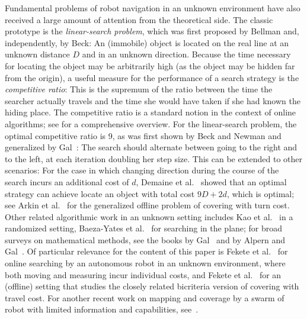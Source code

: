 Fundamental problems of robot navigation in an unknown environment have also received a large amount of attention from the theoretical side.
The classic prototype is the {\em linear-search problem}, which was first proposed by Bellman \cite{B63} and, independently,
by Beck\cite{B64}: An (immobile) object is located on the real line at an unknown distance $D$ and in an unknown direction.
Because the time necessary for locating the object may be arbitrarily high (as the object may be hidden far
from the origin), a useful measure for the performance of a search strategy
is the {\em competitive ratio}: This is the supremum of the ratio
between the time the searcher actually travels and the time she would have
taken if she had known the hiding place. 
 The competitive ratio is
a standard notion in the context of online algorithms; see \cite{FW98}
for a comprehensive overview. 
For the linear-search problem, the optimal competitive ratio is 9,
as was first shown by Beck and Newman \cite{BN70} and generalized by Gal~\cite{G72,G74}: The search should alternate
between going to the right and to the left, at each iteration doubling
her step size. This can be extended to other scenarios: For the case in which changing direction during the course 
of the search incurs an additional cost of $d$, Demaine et al.~\cite{dfg-olstc-06} showed that an optimal strategy can achieve
locate an object with total cost $9D+2d$, which is optimal; see Arkin et al.~\cite{abd+-octtc-05} for the generalized
offline problem of covering with turn cost. Other related algorithmic work in an unknown setting includes Kao et al.~\cite{KRT96}
in a randomized setting, Baeza-Yates et al.~\cite{BCR93} for searching in the plane; for broad surveys on mathematical
methods, see the books by Gal~\cite{G80} and by Alpern and Gal~\cite{AG03}.
Of particular relevance for the content of this paper is 
Fekete et al.~\cite{fkn-sar-04,fkn-osar-06} for online searching by an autonomous robot in an unknown environment,
where both moving and measuring incur individual costs, and Fekete et al.~\cite{fms-mctc-10} for an (offline)
setting that studies the closely related bicriteria version of covering with travel cost.
For another recent work on mapping and coverage by a swarm of robot with limited information and capabilities, see~\cite{lfm-stmrs-16}.

